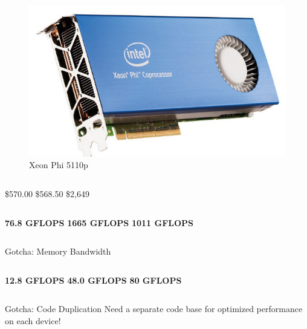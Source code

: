 \documentclass[12pt]{beamer}
\begin{document}
\begin{frame}
\begin{columns}
\begin{figure}
\includegraphics[width=\textwidth]{img/phi5110p}
\vspace{9pt}
\caption{Xeon Phi 5110p}
\end{figure}
\end{columns}
\pause
\begin{columns}
\centering
\$570.00
\centering
\$568.50
\centering
\$2,649
\end{columns}
\pause
\begin{columns}
\centering
\textbf{76.8 GFLOPS}
\centering
\textbf{1665 GFLOPS}
\centering
\textbf{1011 GFLOPS}
\end{columns}
\pause
\begin{alertblock}{Gotcha: Memory Bandwidth}
\begin{columns}
\centering
\textbf{12.8 GFLOPS}
\centering
\textbf{48.0 GFLOPS}
\centering
\textbf{80 GFLOPS}
\end{columns}
\end{alertblock}
\pause
\begin{alertblock}{Gotcha: Code Duplication}
Need a separate code base for optimized performance on each device!
\end{alertblock}
\end{frame}
\end{document}

